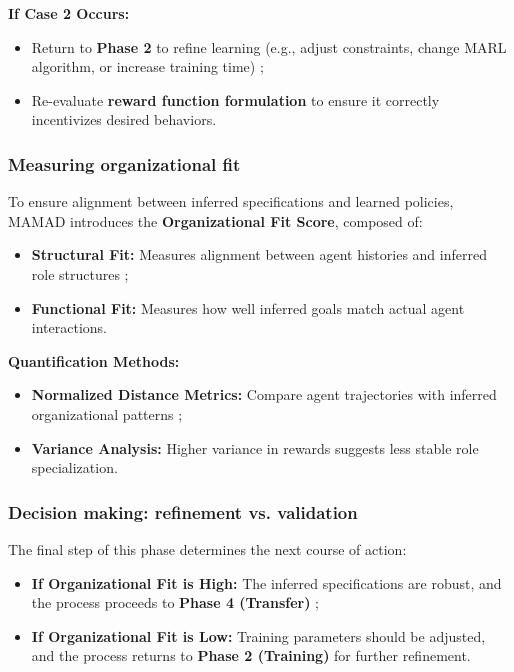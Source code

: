 \documentclass[journal]{IEEEtai}
\begin{document}
\noindent \textbf{If Case 2 Occurs:}
\begin{itemize}
    \item Return to \textbf{Phase 2} to refine learning (e.g., adjust constraints, change MARL algorithm, or increase training time) ;
    \item Re-evaluate \textbf{reward function formulation} to ensure it correctly incentivizes desired behaviors.
\end{itemize}

\subsubsection{Measuring organizational fit}
To ensure alignment between inferred specifications and learned policies, MAMAD introduces the \textbf{Organizational Fit Score}, composed of:

\begin{itemize}
    \item \textbf{Structural Fit:} Measures alignment between agent histories and inferred role structures ;
    \item \textbf{Functional Fit:} Measures how well inferred goals match actual agent interactions.
\end{itemize}

\noindent \textbf{Quantification Methods:}
\begin{itemize}
    \item \textbf{Normalized Distance Metrics:} Compare agent trajectories with inferred organizational patterns ;
    \item \textbf{Variance Analysis:} Higher variance in rewards suggests less stable role specialization.
\end{itemize}

\subsubsection{Decision making: refinement vs. validation}
The final step of this phase determines the next course of action:

\begin{itemize}
    \item \textbf{If Organizational Fit is High:} The inferred specifications are robust, and the process proceeds to \textbf{Phase 4 (Transfer)} ;
    \item \textbf{If Organizational Fit is Low:} Training parameters should be adjusted, and the process returns to \textbf{Phase 2 (Training)} for further refinement.
\end{itemize}
\end{document}
